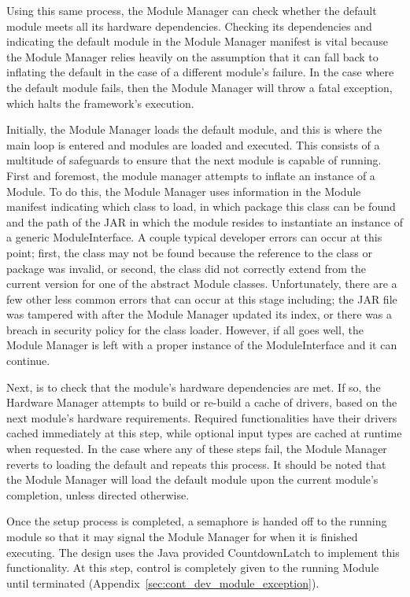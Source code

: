 \documentclass[11pt,letterpaper]{article}
\begin{document}
	Using this same process, the Module Manager can check whether the default
	module meets all its hardware dependencies. Checking its dependencies and
	indicating the default module in the Module Manager manifest is vital because
	the Module Manager relies heavily on the assumption that it can fall back to
	inflating the default in the case of a different module's failure. In the case
	where the default module fails, then the Module Manager will throw a fatal
	exception, which halts the framework's execution.

	Initially, the Module Manager loads the default module, and this is where 
	the main loop is entered and modules are loaded and executed. This 
	consists of a multitude of safeguards to ensure that the next module is 
	capable of running. First and foremost, the module manager attempts to inflate
	an instance of a Module. To do this, the Module Manager uses information in
	the Module manifest indicating which class to load, in which package this
	class can be found and the path of the JAR in which the module resides to
	instantiate an instance of a generic ModuleInterface.  A couple typical
	developer errors can occur at this point; first, the class may not be found
	because the reference to the class or package was invalid, or second, the
	class did not correctly extend from the current version for one of the
	abstract Module classes. Unfortunately, there are a few other less common
	errors that can occur at this stage including; the JAR file was tampered with
	after the Module Manager updated its index, or there was a breach in security
	policy for the class loader. However, if all goes well, the Module Manager is
	left with a proper instance of the ModuleInterface and it can continue.
	
	Next, is to check that the module's hardware dependencies are met. If so, the
	Hardware Manager attempts to build or re-build a cache of drivers, based on
	the next module's hardware requirements. Required functionalities have their
	drivers cached immediately at this step, while optional input types are cached
	at runtime when requested. In the case where any of these steps fail,  the
	Module Manager reverts to loading the default and repeats this process. It
	should be noted that the Module Manager will load the default module upon the
	current module's completion, unless directed otherwise.

	Once the setup process is completed, a semaphore is handed off to the running
	module so that it may signal the Module Manager for when it is finished
	executing. The design uses the Java provided CountdownLatch to implement this
	functionality. At this step, control is completely given to the running Module
	until terminated (Appendix~\ref{sec:cont_dev_module_exception}).
\end{document}
